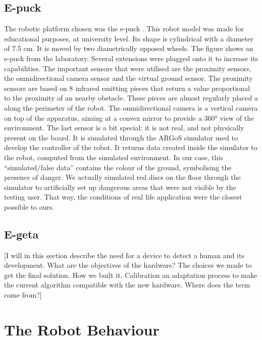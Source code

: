 \documentclass[oneside, a4paper, 12pt]{memoir}
\begin{document}
		\subsection{E-puck}
		
		The robotic platform chosen was the e-puck \citep{mondada2009puck}. This robot model was made for educational purposes, at university level. Its shape is cylindrical with a diameter of 7.5 cm. It is moved by two diametrically opposed wheels. The figure  shows an e-puck from the laboratory. Several extensions were plugged onto it to increase its capabilities. The important sensors that were utilised are the proximity sensors, the omnidirectional camera sensor and the virtual ground sensor. The proximity sensors are based on 8 infrared emitting pieces that return a value proportional to the proximity of an nearby obstacle. These pieces are almost regularly placed a along the perimeter of the robot. The omnidirectional camera is a vertical camera on top of the apparatus, aiming at a convex mirror to provide a 360° view of the environment. The last sensor is a bit special: it is not real, and not physically present on the board. It is simulated through the ARGoS simulator used to develop the controller of the robot. It returns data created inside the simulator to the robot, computed from the simulated environment. In our case, this \enquote{simulated/false data} contains the colour of the ground, symbolising the presence of danger. We actually simulated red discs on the floor through the simulator to artificially set up dangerous areas that were not visible by the testing user. That way, the conditions of real life application were the closest possible to ours.
		
		\subsection{E-geta} %
	
		[I will in this section describe the need for a device to detect a human and its development. What are the objectives of the hardware? The choices we made to get the final solution. How we built it. Calibration an adaptation process to make the current algorithm compatible with the new hardware. Where does the term come from?]
	
	
	\section{The Robot Behaviour}
			
\end{document}
